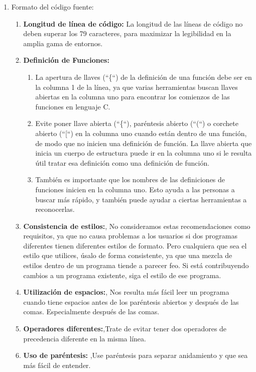 \begin{enumerate} 
\item Formato del código fuente:
	\begin{enumerate}
	\item {\bf Longitud de línea de código:} La longitud de las líneas de código no deben superar los 79 caracteres, para maximizar la legibilidad en la amplia gama de entornos.
	\item {\bf Definición de Funciones:}
	\begin{enumerate}
	\item La apertura de llaves (“\{“) de la definición de una función debe ser en la columna 1 de la línea, ya que varias herramientas buscan llaves abiertas en la columna uno para encontrar los comienzos de las funciones en lenguaje C.
	\item 	Evite poner llave abierta (“\{“), paréntesis abierto (“(“) o corchete abierto (“[“) en la columna uno cuando están dentro de una función, de modo que no inicien una definición de función. La llave abierta que inicia un cuerpo de estructura puede ir en la columna uno si le resulta útil tratar esa definición como una definición de función.
	\item 	También es importante que los nombres de las definiciones de funciones inicien en la columna uno. Esto ayuda a las personas a buscar más rápido, y también puede ayudar a ciertas herramientas a reconocerlas.
	\end{enumerate}
		\item {\bf Consistencia de estilos:}, No consideramos estas recomendaciones como requisitos, ya que no causa problemas a los usuarios si dos programas diferentes tienen diferentes estilos de formato. Pero cualquiera que sea el estilo que utilices, úsalo de forma consistente, ya que una mezcla de estilos dentro de un programa tiende a parecer feo. Si está contribuyendo cambios a un programa existente, siga el estilo de ese programa.
		\item {\bf Utilización de espacios:}, Nos resulta más fácil leer un programa cuando tiene espacios antes de los paréntesis abiertos y después de las comas. Especialmente después de las comas.
		\item {\bf Operadores diferentes:},Trate de evitar tener dos operadores de precedencia diferente en la misma línea.
		\item {\bf Uso de paréntesis: },Use paréntesis para separar anidamiento y que sea más fácil de entender.
		

\end{enumerate}
\end{enumerate}
